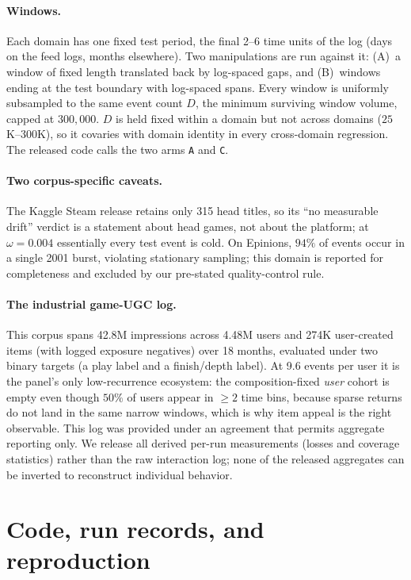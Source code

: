 \documentclass[10pt,letterpaper]{article}
\begin{document}
\paragraph{Windows.}
Each domain has one fixed test period, the final 2--6 time units of the log
(days on the feed logs, months elsewhere). Two manipulations are run against
it: (A)~a window of fixed length translated back by log-spaced gaps, and
(B)~windows ending at the test boundary with log-spaced spans. Every window
is uniformly subsampled to the same event count $D$, the minimum surviving
window volume, capped at $300{,}000$. $D$ is held fixed within a domain but
not across domains ($25$K--$300$K), so it covaries with domain identity in
every cross-domain regression. The released code calls the two arms
\texttt{A} and \texttt{C}.

\paragraph{Two corpus-specific caveats.}
The Kaggle Steam release retains only 315 head titles, so its ``no
measurable drift'' verdict is a statement about head games, not about the
platform; at $\omega = 0.004$ essentially every test event is cold. On
Epinions, $94\%$ of events occur in a single 2001 burst, violating
stationary sampling; this domain is reported for completeness and excluded by
our pre-stated quality-control rule.

\paragraph{The industrial game-UGC log.}
This corpus spans 42.8M impressions across 4.48M users and 274K user-created
items (with logged exposure negatives) over 18 months, evaluated under two
binary targets (a play label and a finish/depth label). At 9.6 events per user
it is the panel's only low-recurrence ecosystem: the composition-fixed
\emph{user} cohort is empty even though $50\%$ of users appear in $\ge 2$ time
bins, because sparse returns do not land in the same narrow windows, which is
why item appeal is the right observable. This log was provided under an
agreement that permits aggregate reporting only. We release all derived
per-run measurements (losses and coverage statistics) rather than the raw
interaction log; none of the released aggregates can be inverted to reconstruct
individual behavior.

\section{Code, run records, and reproduction}
\label{sup:code}
\end{document}
